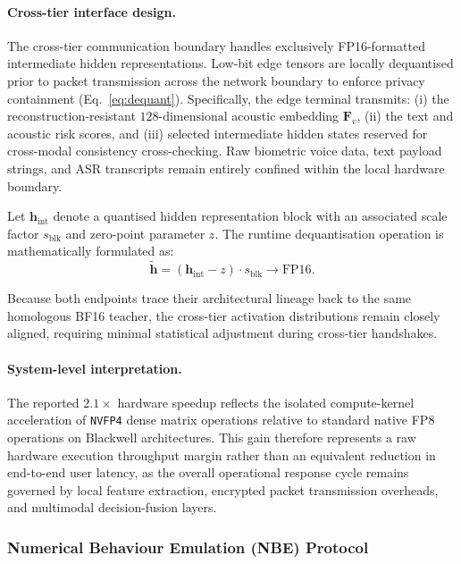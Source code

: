 \documentclass[a4paper,fleqn]{cas-sc}
\begin{document}
\paragraph{Cross-tier interface design.}
The cross-tier communication boundary handles exclusively FP16-formatted intermediate hidden representations. Low-bit edge tensors are locally dequantised prior to packet transmission across the network boundary to enforce privacy containment (Eq.~\ref{eq:dequant}). Specifically, the edge terminal transmits: (i) the reconstruction-resistant $128\text{-dimensional}$ acoustic embedding $\bm{F}_v$, (ii) the text and acoustic risk scores, and (iii) selected intermediate hidden states reserved for cross-modal consistency cross-checking. Raw biometric voice data, text payload strings, and ASR transcripts remain entirely confined within the local hardware boundary.

Let $\bm{h}_{\mathrm{int}}$ denote a quantised hidden representation block with an associated scale factor $s_{\mathrm{blk}}$ and zero-point parameter $z$. The runtime dequantisation operation is mathematically formulated as:
\begin{equation}
\label{eq:dequant}
\tilde{\bm{h}} = (\bm{h}_{\mathrm{int}} - z) \cdot s_{\mathrm{blk}} \to \text{FP16}.
\end{equation}

Because both endpoints trace their architectural lineage back to the same homologous BF16 teacher, the cross-tier activation distributions remain closely aligned, requiring minimal statistical adjustment during cross-tier handshakes.

\paragraph{System-level interpretation.}
The reported $2.1\times$ hardware speedup reflects the isolated compute-kernel acceleration of \texttt{NVFP4} dense matrix operations relative to standard native FP8 operations on Blackwell architectures. This gain therefore represents a raw hardware execution throughput margin rather than an equivalent reduction in end-to-end user latency, as the overall operational response cycle remains governed by local feature extraction, encrypted packet transmission overheads, and multimodal decision-fusion layers.

\subsubsection{Numerical Behaviour Emulation (NBE) Protocol}\label{sec:nbe}
\end{document}
